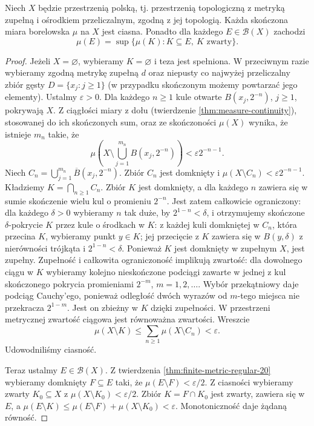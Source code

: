 \begin{twierdzenie}
\label{thm:polish-tight-20}
Niech $X$ będzie przestrzenią polską, tj. przestrzenią
topologiczną z metryką zupełną i ośrodkiem przeliczalnym,
zgodną z jej topologią. Każda skończona miara borelowska
$\mu$ na $X$ jest ciasna. Ponadto dla każdego
$E\in\mathcal B(X)$ zachodzi
\[
 \mu(E)=\sup\{\mu(K):K\subseteq E,\ K\text{ zwarty}\}.
\]
\end{twierdzenie}
\begin{proof}
Jeżeli $X=\varnothing$, wybieramy $K=\varnothing$ i teza jest
spełniona. W przeciwnym razie wybieramy zgodną metrykę
zupełną $d$ oraz niepusty co najwyżej przeliczalny
zbiór gęsty $D=\{x_j:j\ge1\}$ (w przypadku skończonym
możemy powtarzać jego elementy). Ustalmy $\varepsilon>0$.
Dla każdego $n\ge1$ kule otwarte
$B(x_j,2^{-n})$, $j\ge1$, pokrywają $X$.
Z ciągłości miary z dołu (twierdzenie \ref{thm:measure-continuity}),
stosowanej do ich skończonych sum, oraz ze skończoności
$\mu(X)$ wynika, że istnieje $m_n$ takie, że
\[
\mu\left(X\setminus\bigcup_{j=1}^{m_n}B(x_j,2^{-n})\right)
<\varepsilon 2^{-n-1}.
\]
Niech $C_n=\bigcup_{j=1}^{m_n}\overline{B}(x_j,2^{-n})$.
Zbiór $C_n$ jest domknięty i
$\mu(X\setminus C_n)<\varepsilon2^{-n-1}$.
Kładziemy $K=\bigcap_{n\ge1}C_n$.
Zbiór $K$ jest domknięty, a dla każdego $n$
zawiera się w sumie skończenie wielu kul o promieniu
$2^{-n}$. Jest zatem całkowicie ograniczony:
dla każdego $\delta>0$ wybieramy $n$ tak duże,
by $2^{1-n}<\delta$, i otrzymujemy skończone
$\delta$-pokrycie $K$ przez kule o środkach w $K$:
z każdej kuli domkniętej w $C_n$, która przecina $K$,
wybieramy punkt $y\in K$; jej przecięcie z $K$ zawiera się
w $B(y,\delta)$ z nierówności trójkąta i $2^{1-n}<\delta$.
Ponieważ $K$ jest domknięty w zupełnym $X$, jest zupełny.
Zupełność i całkowita ograniczoność implikują zwartość:
dla dowolnego ciągu w $K$ wybieramy kolejno nieskończone
podciągi zawarte w jednej z kul skończonego pokrycia
promieniami $2^{-m}$, $m=1,2,\ldots$. Wybór przekątniowy
daje podciąg Cauchy'ego, ponieważ odległość dwóch wyrazów
od $m$-tego miejsca nie przekracza $2^{1-m}$.
Jest on zbieżny w $K$ dzięki zupełności. W przestrzeni
metrycznej zwartość ciągowa jest równoważna zwartości. Wreszcie
\[
 \mu(X\setminus K)
 \le\sum_{n\ge1}\mu(X\setminus C_n)<\varepsilon.
\]
Udowodniliśmy ciasność.

Teraz ustalmy $E\in\mathcal B(X)$. Z twierdzenia
\ref{thm:finite-metric-regular-20} wybieramy domknięty
$F\subseteq E$ taki, że $\mu(E\setminus F)<\varepsilon/2$.
Z ciasności wybieramy zwarty $K_0\subseteq X$
z $\mu(X\setminus K_0)<\varepsilon/2$.
Zbiór $K=F\cap K_0$ jest zwarty, zawiera się w $E$, a
$\mu(E\setminus K)\le\mu(E\setminus F)+\mu(X\setminus K_0)
<\varepsilon$. Monotoniczność daje żądaną równość.
\end{proof}

